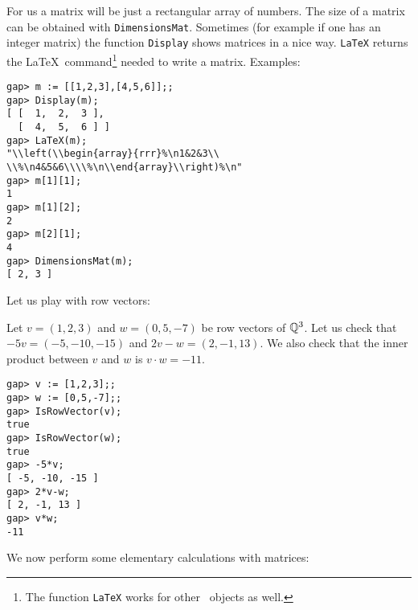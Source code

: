 For us a matrix will be just a rectangular array of numbers.  The size of a
matrix can be obtained with \lstinline{DimensionsMat}.  Sometimes (for example
if one has an integer matrix) the function \lstinline{Display} shows matrices
in a nice way.  \lstinline{LaTeX} returns the \LaTeX~command\footnote{The
function \lstinline{LaTeX} works for other \GAP~objects as well.} needed to
write a matrix. 
Examples:
\begin{lstlisting}
gap> m := [[1,2,3],[4,5,6]];;                                         
gap> Display(m);
[ [  1,  2,  3 ],
  [  4,  5,  6 ] ]
gap> LaTeX(m);
"\\left(\\begin{array}{rrr}%\n1&2&3\\
\\%\n4&5&6\\\\%\n\\end{array}\\right)%\n"
gap> m[1][1];
1
gap> m[1][2];
2
gap> m[2][1];
4
gap> DimensionsMat(m);
[ 2, 3 ]
\end{lstlisting}

Let us play with row vectors:

\begin{example}
Let $v=(1,2,3)$ and $w=(0,5,-7)$ be row vectors of $\mathbb{Q}^3$. 
Let us check that $-5v=(-5,-10,-15)$ and $2v-w=(2,-1,13)$. We also check that the inner product between $v$ and $w$ is $v\cdot w=-11$. 
\begin{lstlisting}
gap> v := [1,2,3];;
gap> w := [0,5,-7];;
gap> IsRowVector(v);
true
gap> IsRowVector(w);
true
gap> -5*v;
[ -5, -10, -15 ]
gap> 2*v-w;
[ 2, -1, 13 ]
gap> v*w;
-11
\end{lstlisting}
\end{example}

We now perform some elementary calculations with matrices: 

